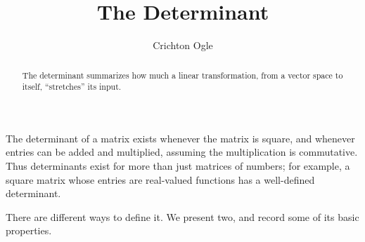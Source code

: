 \documentclass{ximera}
\title{The Determinant}
\author{Crichton Ogle}
\begin{document}
\begin{abstract}
  The determinant summarizes how much a linear transformation,
  from a vector space to itself, ``stretches'' its input.
\end{abstract}
\maketitle

The determinant of a matrix exists whenever the matrix is square, and
whenever entries can be added and multiplied, assuming the multiplication is commutative. Thus determinants exist
for more than just matrices of numbers; for example, a square matrix
whose entries are real-valued functions has a well-defined
determinant.

There are different ways to define it. We present two, and record some of its basic properties.
\end{document}
